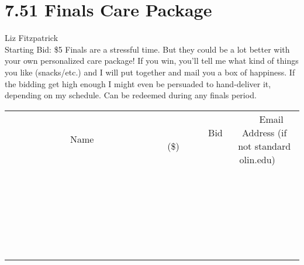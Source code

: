 \documentclass[11pt]{article}
\begin{document}
\section*{7.51 Finals Care Package}
Liz Fitzpatrick
\\
Starting Bid: \$5
\newline
Finals are a stressful time. But they could be a lot better with your own personalized care package! If you win, you'll tell me what kind of things you like (snacks/etc.) and I will put together and mail you a box of happiness. If the bidding get high enough I might even be persuaded to hand-deliver it, depending on my schedule. Can be redeemed during any finals period.
\\[6ex]
\begin{tabular}{c c c}
~~~~~~~~~~~~~Name~~~~~~~~~~~~~ & ~~~~~~~~~Bid (\$)~~~~~~~~~  & ~~~Email Address (if not standard olin.edu)~~~\\
 & & \\
\hline
 & & \\
\hline
 & & \\
\hline
 & & \\
\hline
 & & \\
\hline
 & & \\
\hline
 & & \\
\hline
 & & \\
\hline
 & & \\
\hline
 & & \\
\hline
 & & \\
\hline
 & & \\
\hline
 & & \\
\hline
 & & \\
\hline
 & & \\
\hline
 & & \\
\hline
 & & \\
\hline
 & & \\
\hline
 & & \\
\hline
 & & \\
\hline
 & & \\
\hline
 & & \\
\hline
 & & \\
\hline
 & & \\
\hline
 & & \\
\hline
 & & \\
\hline
\end{tabular}
\newpage
\end{document}
